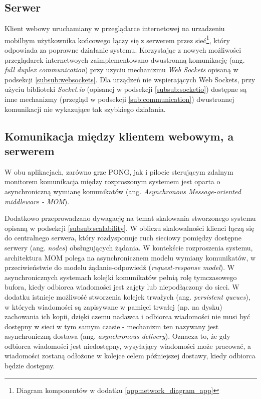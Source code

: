 \subsection{Serwer}

Klient webowy uruchamiany w przeglądarce internetowej na urzadzeniu mobilbym użytkownika końcowego łączy się z serwerem przez sieć\footnote{Diagram komponentów w dodatku \ref{app:network_diagram_app}}, który odpowiada za poprawne działanie systemu. Korzystając z nowych możliwości przeglądarek internetwoych zaimplementowano dwustronną komunikację (ang. \emph{full duplex communication}) przy uzyciu mechanizmu \emph{Web Sockets}\cite{websockets-rfc} opisaną w podsekcji \ref{subsub:websockets}. Dla urządzeń nie wspierających Web Sockets, przy użyciu biblioteki \emph{Socket.io} (opisanej w podsekcji \ref{subsub:socketio}) dostępne są inne mechanizmy (przegląd w podsekcji \ref{sub:communication}) dwustronnej komunikacji nie wykazujące tak szybkiego działania.

\subsection{Komunikacja między klientem webowym, a serwerem}

W obu aplikacjach, zarówno grze PONG, jak i pilocie sterującym zdalnym monitorem komunikacja między rozproszonym systemem jest oparta o asynchroniczną wymianę komunikatów (ang. \emph{Asynchronous Message-oriented middleware - MOM})\cite{message-oriented-middleware}.

Dodatkowo przeprowadzano dywagację na temat skalowania stworzonego systemu opisaną w podsekcji \ref{subsub:scalability}. W obliczu skalowalności klienci łączą się do centralnego serwera, który rozdysponuje ruch sieciowy pomiędzy dostępne serwery (ang. \emph{nodes}) obsługujących żądania. W kontekście rozproszenia systemu, architektura MOM polega na asynchronicznem modelu wymiany komunikatów, w przeciwieństwie do modelu żądanie-odpowiedź (\emph{request-response model}). W asynchronicznych systemach kolejki komunikatów pełnią rolę tymczasowego bufora, kiedy odbiorca wiadomości jest zajęty lub niepodłączony do sieci. W dodatku istnieje możliwość stworzenia kolejek trwałych (ang. \emph{persistent queues}), w których wiadomości są zapisywane w pamięci trwałej (np. na dysku) zachowania ich kopii, dzięki czemu nadawca i odbiorca wiadomości nie musi być dostępny w sieci w tym samym czasie - mechanizm ten nazywany jest asynchroniczną dostawa (ang. \emph{asynchronous delivery}). Oznacza to, że gdy odbiorca wiadomości jest niedostępny, wysyłający wiadomości może pracować, a wiadomości zostaną odłożone w kolejce celem późniejszej dostawy, kiedy odbiorca będzie dostępny.

